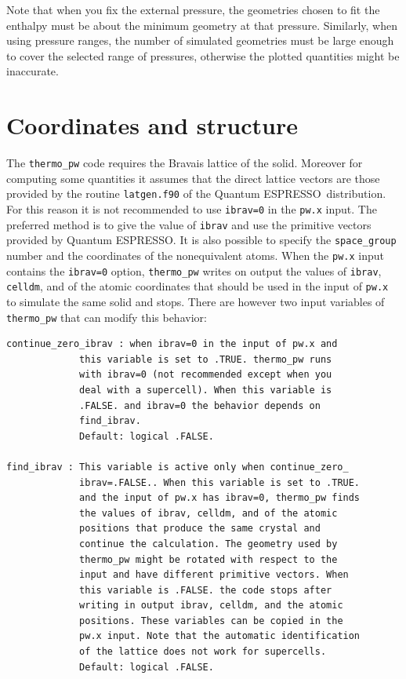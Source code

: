 \documentclass[12pt,a4paper,twoside]{report}
\def\qe{{\sc Quantum ESPRESSO}}
\begin{document}
Note that when you fix the external pressure, the geometries chosen to 
fit the enthalpy must be about the minimum geometry at that pressure.
Similarly, when using pressure ranges, the number of simulated geometries 
must be large enough to cover the selected range of pressures, otherwise 
the plotted quantities might be inaccurate.

\newpage
{\color{coral}\section{Coordinates and structure}}
\color{black}
The \texttt{thermo\_pw} code requires the Bravais lattice of the solid. 
Moreover for computing some quantities it assumes that the direct lattice 
vectors are those provided by the routine \texttt{latgen.f90} of the \qe\ 
distribution. 
For this reason it is not recommended to use \texttt{ibrav=0} in the
\texttt{pw.x} input. The preferred method is to give the value of 
\texttt{ibrav} and use the primitive vectors provided by \qe.
It is also possible to specify the \texttt{space\_group} number and 
the coordinates of the nonequivalent atoms. When the 
\texttt{pw.x} input contains the \texttt{ibrav=0} option, 
\texttt{thermo\_pw} writes on output
the values of \texttt{ibrav}, \texttt{celldm}, and of the atomic coordinates
that should be used in the input of \texttt{pw.x} to simulate the same 
solid and stops. There are however two input variables of \texttt{thermo\_pw} 
that can modify this behavior:

\begin{verbatim}
continue_zero_ibrav : when ibrav=0 in the input of pw.x and 
             this variable is set to .TRUE. thermo_pw runs 
             with ibrav=0 (not recommended except when you 
             deal with a supercell). When this variable is 
             .FALSE. and ibrav=0 the behavior depends on 
             find_ibrav.
             Default: logical .FALSE.

find_ibrav : This variable is active only when continue_zero_
             ibrav=.FALSE.. When this variable is set to .TRUE. 
             and the input of pw.x has ibrav=0, thermo_pw finds 
             the values of ibrav, celldm, and of the atomic 
             positions that produce the same crystal and 
             continue the calculation. The geometry used by 
             thermo_pw might be rotated with respect to the 
             input and have different primitive vectors. When 
             this variable is .FALSE. the code stops after 
             writing in output ibrav, celldm, and the atomic 
             positions. These variables can be copied in the 
             pw.x input. Note that the automatic identification 
             of the lattice does not work for supercells.
             Default: logical .FALSE.
\end{verbatim}
\end{document}
